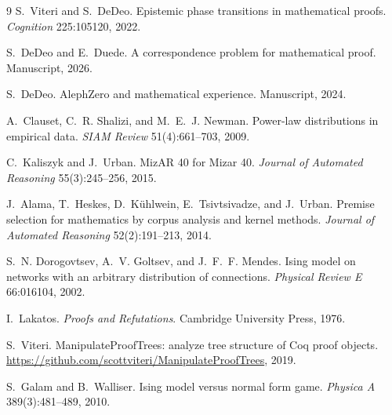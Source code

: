 \documentclass[11pt]{article}
\begin{document}
\begin{thebibliography}{9}
 S.~Viteri and S.~DeDeo.
Epistemic phase transitions in mathematical proofs.
\emph{Cognition} 225:105120, 2022.

 S.~DeDeo and E.~Duede.
A correspondence problem for mathematical proof. Manuscript, 2026.

 S.~DeDeo.
AlephZero and mathematical experience. Manuscript, 2024.

 A.~Clauset, C.~R. Shalizi, and M.~E.~J. Newman.
Power-law distributions in empirical data.
\emph{SIAM Review} 51(4):661--703, 2009.

 C.~Kaliszyk and J.~Urban.
MizAR 40 for Mizar 40.
\emph{Journal of Automated Reasoning} 55(3):245--256, 2015.

 J.~Alama, T.~Heskes, D.~K\"uhlwein, E.~Tsivtsivadze, and J.~Urban.
Premise selection for mathematics by corpus analysis and kernel methods.
\emph{Journal of Automated Reasoning} 52(2):191--213, 2014.

 S.~N. Dorogovtsev, A.~V. Goltsev, and J.~F.~F. Mendes.
Ising model on networks with an arbitrary distribution of connections.
\emph{Physical Review E} 66:016104, 2002.

 I.~Lakatos.
\emph{Proofs and Refutations}. Cambridge University Press, 1976.

 S.~Viteri. ManipulateProofTrees: analyze tree structure of Coq proof
objects. \url{https://github.com/scottviteri/ManipulateProofTrees}, 2019.

 S.~Galam and B.~Walliser.
Ising model versus normal form game.
\emph{Physica A} 389(3):481--489, 2010.
\end{thebibliography}
\end{document}
